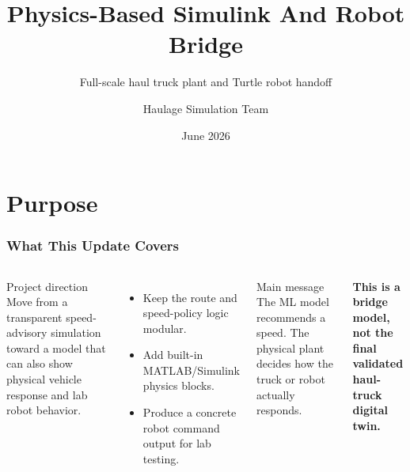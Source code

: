 \documentclass[aspectratio=169]{beamer}
\title[Physics And Robot Bridge]{Physics-Based Simulink And Robot Bridge}
\subtitle{Full-scale haul truck plant and Turtle robot handoff}
\author[Haulage Simulation Team]{Haulage Simulation Team}
\date{June 2026}
\begin{document}
\frame{\titlepage}

\section{Purpose}

\begin{frame}
\frametitle{What This Update Covers}

\begin{columns}[T,totalwidth=\textwidth]
\begin{block}{Project direction}
Move from a transparent speed-advisory simulation toward a model that can also show physical vehicle response and lab robot behavior.
\end{block}

\vspace{0.35cm}
\begin{itemize}
    \item Keep the route and speed-policy logic modular.
    \item Add built-in MATLAB/Simulink physics blocks.
    \item Produce a concrete robot command output for lab testing.
\end{itemize}

\begin{alertblock}{Main message}
The ML model recommends a speed. The physical plant decides how the truck or robot actually responds.
\end{alertblock}

\vspace{0.35cm}
\small
\textbf{This is a bridge model, not the final validated haul-truck digital twin.}
\end{columns}

\end{frame}
\end{document}
